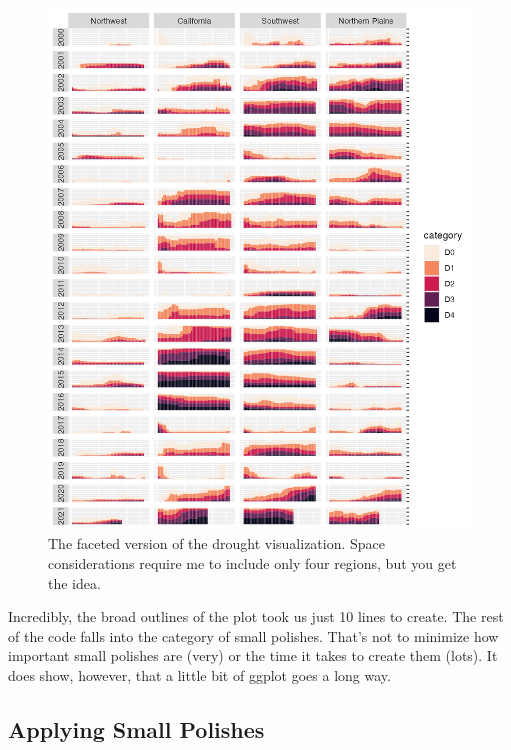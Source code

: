 \documentclass[
]{book}
\begin{document}
\begin{figure}
\includegraphics[width=1\linewidth]{data-viz_files/figure-latex/drought-viz-faceted-plot-1} \caption{The faceted version of the drought visualization. Space considerations require me to include only four regions, but you get the idea.}\label{fig:drought-viz-faceted-plot}
\end{figure}

Incredibly, the broad outlines of the plot took us just 10 lines to create. The rest of the code falls into the category of small polishes. That's not to minimize how important small polishes are (very) or the time it takes to create them (lots). It does show, however, that a little bit of ggplot goes a long way.

\hypertarget{applying-small-polishes}{%
\subsection*{Applying Small Polishes}\label{applying-small-polishes}}
\end{document}
